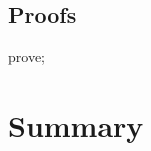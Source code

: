 \subsection*{Proofs}

\begin{LDCheck}\begin{zproof}
   prove;
\end{zproof}\end{LDCheck}

\newpage
\section{Summary}\label{apD.summary}

\ldefsummary %
\lthmsummary %
\lthmaddeddefsummary %
\lthmaddedthmsummary %
\lzevessummary %
